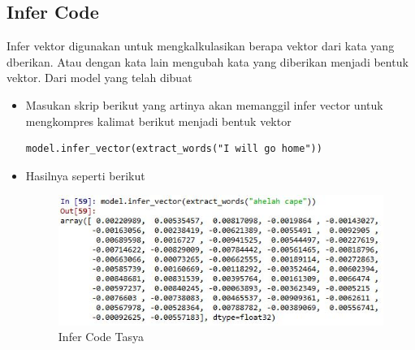 \subsection{Infer Code}
Infer vektor digunakan untuk mengkalkulasikan berapa vektor dari kata yang dberikan. Atau dengan kata lain mengubah kata yang diberikan menjadi bentuk vektor. Dari model yang telah dibuat\\
\begin{itemize}
\item Masukan skrip berikut yang artinya akan memanggil infer vector untuk mengkompres kalimat berikut menjadi bentuk vektor
\begin{verbatim}
model.infer_vector(extract_words("I will go home"))
\end{verbatim}
\item Hasilnya seperti berikut
\begin{figure}[ht]
\centering
\includegraphics[scale=0.5]{figures/chapter5tasya32.jpg}
\caption{Infer Code Tasya}
\label{Praktek}
\end{figure}
\end{itemize}

